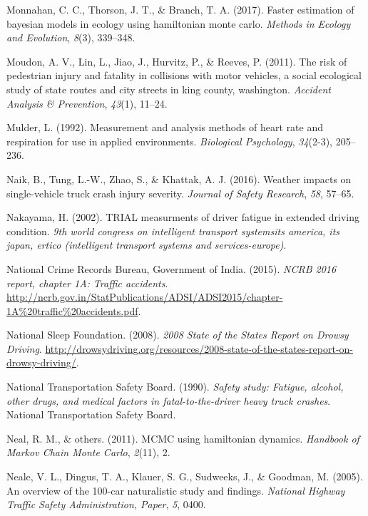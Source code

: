 \documentclass[12pt]{book}
\numberwithin{equation}{chapter}
\begin{document}
\leavevmode\hypertarget{ref-monnahan2017faster}{}%
Monnahan, C. C., Thorson, J. T., \& Branch, T. A. (2017). Faster estimation of bayesian models in ecology using hamiltonian monte carlo. \emph{Methods in Ecology and Evolution}, \emph{8}(3), 339--348.

\leavevmode\hypertarget{ref-moudon2011risk}{}%
Moudon, A. V., Lin, L., Jiao, J., Hurvitz, P., \& Reeves, P. (2011). The risk of pedestrian injury and fatality in collisions with motor vehicles, a social ecological study of state routes and city streets in king county, washington. \emph{Accident Analysis \& Prevention}, \emph{43}(1), 11--24.

\leavevmode\hypertarget{ref-mulder1992measurement}{}%
Mulder, L. (1992). Measurement and analysis methods of heart rate and respiration for use in applied environments. \emph{Biological Psychology}, \emph{34}(2-3), 205--236.

\leavevmode\hypertarget{ref-naik2016weather}{}%
Naik, B., Tung, L.-W., Zhao, S., \& Khattak, A. J. (2016). Weather impacts on single-vehicle truck crash injury severity. \emph{Journal of Safety Research}, \emph{58}, 57--65.

\leavevmode\hypertarget{ref-nakayama2002trial}{}%
Nakayama, H. (2002). TRIAL measurments of driver fatigue in extended driving condition. \emph{9th world congress on intelligent transport systemsits america, its japan, ertico (intelligent transport systems and services-europe)}.

\leavevmode\hypertarget{ref-india2015}{}%
National Crime Records Bureau, Government of India. (2015). \emph{NCRB 2016 report, chapter 1A: Traffic accidents}. \url{http://ncrb.gov.in/StatPublications/ADSI/ADSI2015/chapter-1A\%20traffic\%20accidents.pdf}.

\leavevmode\hypertarget{ref-nsleepf}{}%
National Sleep Foundation. (2008). \emph{2008 State of the States Report on Drowsy Driving}. \url{http://drowsydriving.org/resources/2008-state-of-the-states-report-on-drowsy-driving/}.

\leavevmode\hypertarget{ref-ntsb1990}{}%
National Transportation Safety Board. (1990). \emph{Safety study: Fatigue, alcohol, other drugs, and medical factors in fatal-to-the-driver heavy truck crashes}. National Transportation Safety Board.

\leavevmode\hypertarget{ref-neal2011mcmc}{}%
Neal, R. M., \& others. (2011). MCMC using hamiltonian dynamics. \emph{Handbook of Markov Chain Monte Carlo}, \emph{2}(11), 2.

\leavevmode\hypertarget{ref-neale2005overview}{}%
Neale, V. L., Dingus, T. A., Klauer, S. G., Sudweeks, J., \& Goodman, M. (2005). An overview of the 100-car naturalistic study and findings. \emph{National Highway Traffic Safety Administration, Paper}, \emph{5}, 0400.
\end{document}
